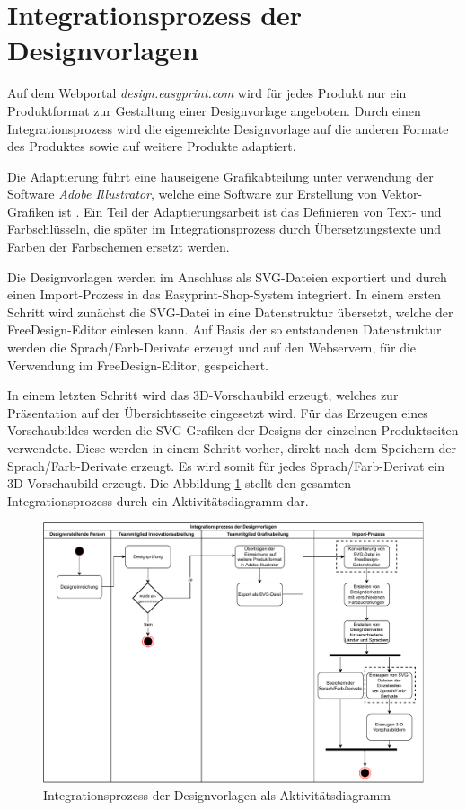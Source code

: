 \section{Integrationsprozess der Designvorlagen}
Auf dem Webportal \emph{design.easyprint.com} wird für jedes Produkt nur ein Produktformat zur Gestaltung einer Designvorlage angeboten. Durch einen Integrationsprozess wird die eigenreichte Designvorlage auf die anderen Formate des Produktes sowie auf weitere Produkte adaptiert.

Die Adaptierung führt eine hauseigene Grafikabteilung unter verwendung der Software \emph{Adobe Illustrator}, welche eine Software zur Erstellung von Vektor-Grafiken ist \autocite[vgl.][]{Adobe:Illustrator}. 
Ein Teil der Adaptierungsarbeit ist das Definieren von Text- und Farbschlüsseln, die später im Integrationsprozess durch Übersetzungstexte und Farben der Farbschemen ersetzt werden. 

Die Designvorlagen werden im Anschluss als SVG-Dateien exportiert und durch einen Import-Prozess in das Easyprint-Shop-System integriert. 
In einem ersten Schritt wird zunächst die SVG-Datei in eine Datenstruktur übersetzt, welche der FreeDesign-Editor einlesen kann. Auf Basis der so entstandenen  
Datenstruktur werden die Sprach/Farb-Derivate erzeugt und auf den Webservern, für die Verwendung im FreeDesign-Editor, gespeichert.  

In einem letzten Schritt wird das 3D-Vorschaubild erzeugt, welches zur Präsentation auf der Übersichtsseite eingesetzt wird. Für das Erzeugen eines Vorschaubildes werden die SVG-Grafiken der Designs der einzelnen Produktseiten verwendete. 
Diese werden in einem Schritt vorher, direkt nach dem Speichern der Sprach/Farb-Derivate erzeugt. Es wird somit für jedes Sprach/Farb-Derivat ein 3D-Vorschaubild erzeugt.
Die Abbildung \ref{fig:Vorlagenimport} stellt den gesamten Integrationsprozess durch ein Aktivitätsdiagramm dar.

\begin{figure}[H]
    \centering
    \includegraphics[width=.98\textwidth]{diagrams/FreeDesign-Vorlagenerstellung.pdf}
\caption{Integrationsprozess der Designvorlagen als Aktivitätsdiagramm}
\label{fig:Vorlagenimport}
\end{figure}

